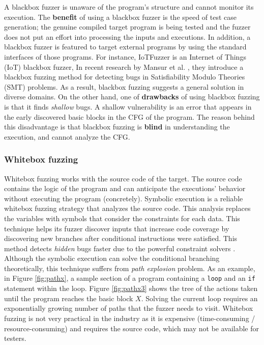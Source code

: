 A blackbox fuzzer is unaware of the program's structure and cannot monitor its execution. The \textbf{benefit} of using a blackbox fuzzer is the speed of test case generation; the genuine compiled target program is being tested and the fuzzer does not put an effort into processing the inputs and executions. In addition, a blackbox fuzzer is featured to target external programs by using the standard interfaces of those programs. For instance, IoTFuzzer \cite{chen2018iotfuzzer} is an Internet of Things (IoT) blackbox fuzzer,  
In recent research by Mansur et al. \cite{mansur2020detecting}, they introduce a blackbox fuzzing method for detecting bugs in Satisfiability Modulo Theories (SMT) problems. As a result, blackbox fuzzing suggests a general solution in diverse domains. On the other hand, one of \textbf{drawbacks} of using blackbox fuzzing is that it finds \textit{shallow} bugs. A shallow vulnerability is an error that appears in the early discovered basic blocks in the CFG of the program. The reason behind this disadvantage is that blackbox fuzzing is \textbf{blind} in understanding the execution, and cannot analyze the CFG.


\subsubsection{Whitebox fuzzing}

Whitebox fuzzing works with the source code of the target. The source code contains the logic of the program and can anticipate the executions' behavior without executing the program (concretely). Symbolic execution \cite{king1976symbolic} is a reliable whitebox fuzzing strategy that analyzes the source code. This analysis replaces the variables with symbols that consider the constraints for each data. This technique helps its fuzzer discover inputs that increase code coverage by discovering new branches after conditional instructions were satisfied. This method detects \textit{hidden} bugs faster due to the powerful constraint solvers \cite{godefroid2008automated}. Although the symbolic execution can solve the conditional branching theoretically, this technique suffers from \textit{path explosion} problem. As an example, in Figure \ref{fig:pathx}, a sample section of a program containing a \texttt{loop} and an \texttt{if} statement within the loop. Figure \ref{fig:pathx3} shows the tree of the actions taken until the program reaches the basic block $X$. Solving the current loop requires an exponentially growing number of paths that the fuzzer needs to visit. Whitebox fuzzing is not very practical in the industry as it is expensive (time-consuming / resource-consuming) and requires the source code, which may not be available for testers.

